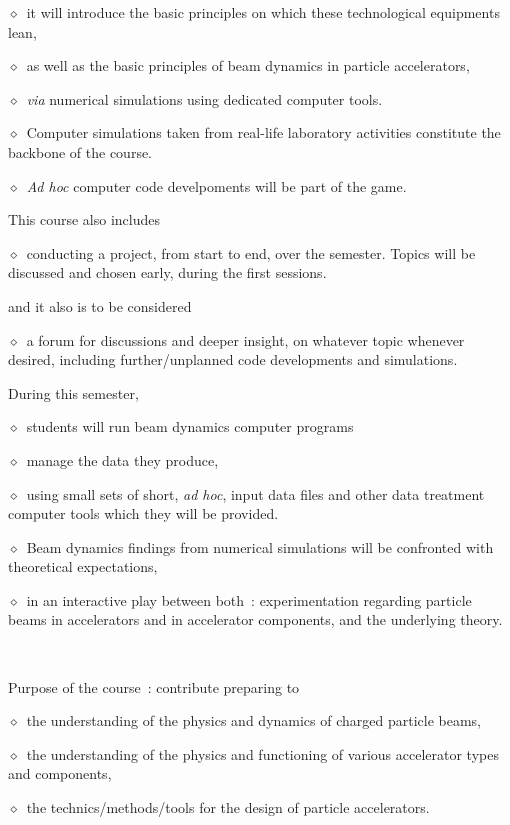 \documentclass[12pt]{article}
\newcommand{\sid}{{\small \ensuremath{\diamond}}~}
\begin{document}
\sid it will introduce  the basic principles on which  these technological equipments lean, 

\sid as well as  the basic principles of beam dynamics in particle accelerators, 

\sid \textsl{via} numerical simulations using dedicated computer tools. 

\sid Computer simulations taken from real-life laboratory activities constitute the backbone of the course.

\sid \textsl{Ad hoc} computer code develpoments will be part of the game.



\clearpage


This course also includes 

\sid conducting a project, from start to end, over the semester. Topics will be discussed and chosen early, 
during the first sessions. 

and it also is to be considered

\sid a forum for discussions and deeper insight, on whatever topic whenever desired, 
including further/unplanned code developments and simulations. 


During this semester, 

\sid students will run beam dynamics computer programs 

\sid manage the data they produce, 

\sid using  small sets of short, \textsl{ad hoc}, 
input data files and other data treatment computer tools which they will be provided. 

\sid Beam dynamics findings from numerical simulations will be confronted with theoretical expectations,  

\sid in an interactive play between both~: experimentation regarding particle beams in accelerators and in accelerator 
components, and the underlying theory.

~

Purpose of the course~:  contribute preparing to 

\sid   the understanding of the physics and dynamics of charged particle beams, 

\sid  the understanding of the physics and functioning of various  accelerator types and components, 

\sid  the technics/methods/tools for the design of  particle accelerators. 

\bigskip
\end{document}
